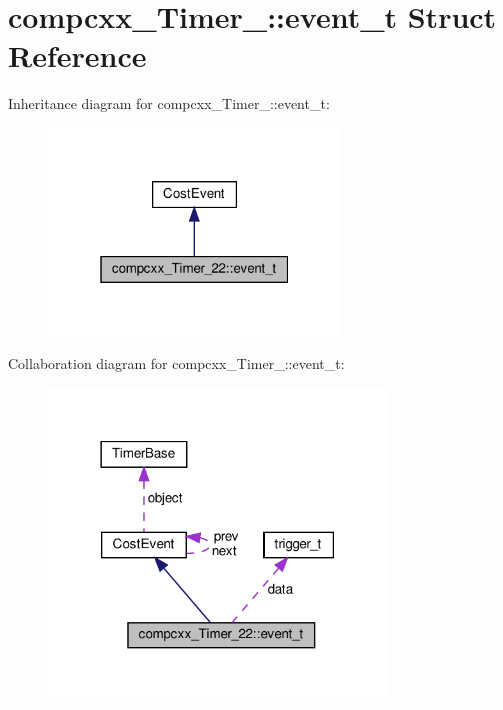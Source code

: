 \hypertarget{structcompcxx__Timer__22_1_1event__t}{}\section{compcxx\+\_\+\+Timer\+\_\+:\+:event\+\_\+t Struct Reference}
\label{structcompcxx__Timer__22_1_1event__t}


Inheritance diagram for compcxx\+\_\+\+Timer\+\_\+:\+:event\+\_\+t\+:\nopagebreak
\begin{figure}[H]
\begin{center}
\leavevmode
\includegraphics[width=220pt]{structcompcxx__Timer__22_1_1event__t__inherit__graph}
\end{center}
\end{figure}


Collaboration diagram for compcxx\+\_\+\+Timer\+\_\+:\+:event\+\_\+t\+:\nopagebreak
\begin{figure}[H]
\begin{center}
\leavevmode
\includegraphics[width=254pt]{structcompcxx__Timer__22_1_1event__t__coll__graph}
\end{center}
\end{figure}
